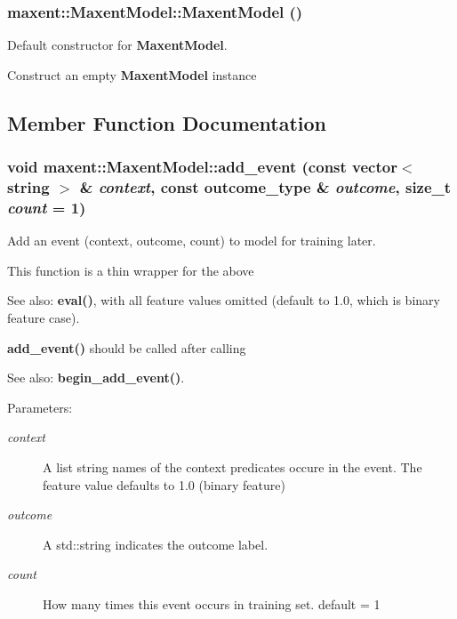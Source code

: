 \subsubsection{\setlength{\rightskip}{0pt plus 5cm}maxent::Maxent\-Model::Maxent\-Model ()}\label{classmaxent_1_1MaxentModel_a0}


Default constructor for {\bf Maxent\-Model}. 

Construct an empty {\bf Maxent\-Model} instance 

\subsection{Member Function Documentation}
\subsubsection{\setlength{\rightskip}{0pt plus 5cm}void maxent::Maxent\-Model::add\_\-event (const vector$<$ string $>$ \& {\em context}, const outcome\_\-type \& {\em outcome}, size\_\-t {\em count} = 1)}\label{classmaxent_1_1MaxentModel_a9}


Add an event (context, outcome, count) to model for training later. 

This function is a thin wrapper for the above \begin{Desc}
\item[See also:]{\bf eval()}, with all feature values omitted (default to 1.0, which is binary feature case).\end{Desc}
{\bf add\_\-event()} should be called after calling \begin{Desc}
\item[See also:]{\bf begin\_\-add\_\-event()}. \end{Desc}
\begin{Desc}
\item[Parameters:]
\begin{description}
\item[{\em context}]A list string names of the context predicates occure in the event. The feature value defaults to 1.0 (binary feature) \item[{\em outcome}]A std::string indicates the outcome label. \item[{\em count}]How many times this event occurs in training set. default = 1 \end{description}
\end{Desc}
